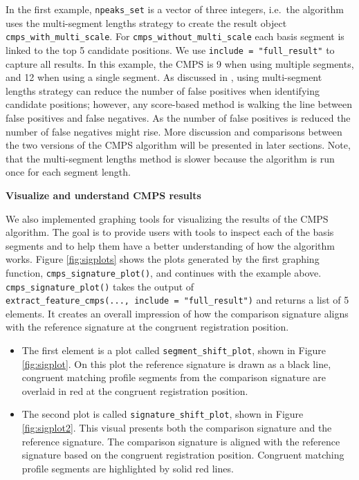 In the first example, \texttt{npeaks\_set} is a vector of three
integers, i.e.~the algorithm uses the multi-segment lengths strategy to
create the result object \texttt{cmps\_with\_multi\_scale}. For
\texttt{cmps\_without\_multi\_scale} each basis segment is linked to the
top 5 candidate positions. We use \texttt{include\ =\ "full\_result"} to
capture all results. In this example, the CMPS is 9 when using multiple
segments, and 12 when using a single segment. As discussed in
\citet{cmps}, using multi-segment lengths strategy can reduce the number
of false positives when identifying candidate positions; however, any
score-based method is walking the line between false positives and false
negatives. As the number of false positives is reduced the number of
false negatives might rise. More discussion and comparisons between the
two versions of the CMPS algorithm will be presented in later sections.
Note, that the multi-segment lengths method is slower because the
algorithm is run once for each segment length.

\textbf{Visualize and understand CMPS results}

We also implemented graphing tools for visualizing the results of the
CMPS algorithm. The goal is to provide users with tools to inspect each
of the basis segments and to help them have a better understanding of
how the algorithm works. Figure \ref{fig:sigplots} shows the plots
generated by the first graphing function,
\texttt{cmps\_signature\_plot()}, and continues with the example above.
\texttt{cmps\_signature\_plot()} takes the output of
\texttt{extract\_feature\_cmps(...,\ include\ =\ "full\_result")} and
returns a list of 5 elements. It creates an overall impression of how
the comparison signature aligns with the reference signature at the
congruent registration position.

\begin{itemize}
\item
  The first element is a plot called \texttt{segment\_shift\_plot},
  shown in Figure \ref{fig:sigplot}. On this plot the reference
  signature is drawn as a black line, congruent matching profile
  segments from the comparison signature are overlaid in red at the
  congruent registration position.
\item
  The second plot is called \texttt{signature\_shift\_plot}, shown in
  Figure \ref{fig:sigplot2}. This visual presents both the comparison
  signature and the reference signature. The comparison signature is
  aligned with the reference signature based on the congruent
  registration position. Congruent matching profile segments are
  highlighted by solid red lines.
\end{itemize}

